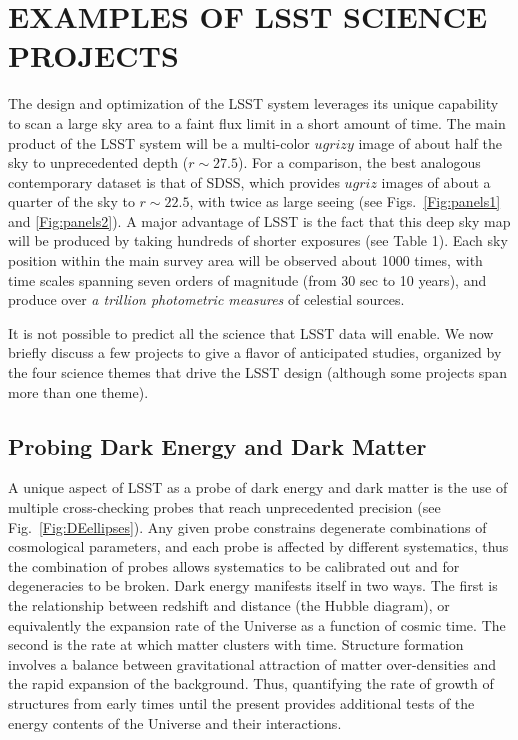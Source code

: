 
\section{  EXAMPLES OF LSST SCIENCE PROJECTS                    }
\label{Sec:science}

The design and optimization of the LSST system leverages its unique capability 
to scan a large sky area to a faint flux limit in a short amount of time. 
The main product of the LSST system will be a multi-color $ugrizy$ image of about 
half the sky to unprecedented depth ($r\sim27.5$). For a comparison, the best 
analogous contemporary dataset is that of SDSS, which provides $ugriz$ images
of about a quarter of the sky to $r\sim22.5$, with twice as large seeing
(see Figs.~\ref{Fig:panels1} and \ref{Fig:panels2}). A major advantage of LSST 
is the fact that this deep sky map will be produced by taking hundreds of
shorter exposures (see Table 1). Each sky position within the main survey area 
will be observed about 1000 times, with time scales spanning seven orders of 
magnitude (from 30 sec to 10 years), and produce over {\it a trillion 
photometric measures} of celestial sources.

It is not possible to predict all the science that LSST data will enable.
We now briefly discuss a few projects to give a flavor of anticipated studies,
organized by the four science themes that drive the LSST design 
(although some projects span more than one theme). 
 
\vskip 0.3in
\subsection{Probing Dark Energy and Dark Matter }

A unique aspect of LSST as a probe of dark energy and dark matter is
the use of multiple cross-checking probes that reach unprecedented
precision (see Fig.~\ref{Fig:DEellipses}). Any given probe constrains
degenerate combinations of cosmological parameters, and each probe is
affected by different systematics, thus the combination of probes
allows systematics to be calibrated out and for degeneracies to be
broken.  Dark energy manifests itself in two ways.  The first is the
relationship between redshift and distance (the Hubble diagram), or
equivalently the expansion rate of the Universe as a function of
cosmic time.  The second is the rate at which matter clusters with
time.  
Structure formation involves a balance between
gravitational attraction of matter over-densities and the rapid
expansion of the background.  Thus, quantifying the rate of growth of
structures from early times until the present provides additional
tests of the energy contents of the Universe and their interactions.

